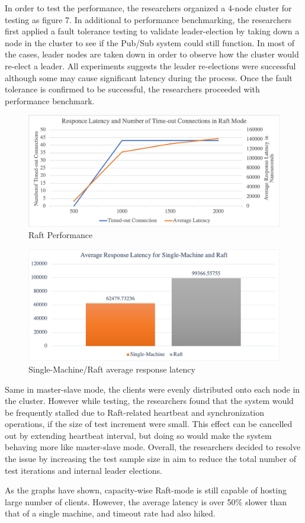 In order to test the performance, the researchers organized a 4-node cluster for testing as figure 7. In additional to performance benchmarking, the researchers first applied a fault tolerance testing to validate leader-election by taking down a node in the cluster to see if the Pub/Sub system could still function. In most of the cases, leader nodes are taken down in order to observe how the cluster would re-elect a leader. All experiments suggests the leader re-elections were successful although some may cause significant latency during the process. Once the fault tolerance is confirmed to be successful, the researchers proceeded with performance benchmark.

	
\begin{figure}[H]
	\centering
	\includegraphics[scale=0.33]{figure/raft/performance.png}
	\caption{Raft Performance}
\end{figure}
	
\begin{figure}[H]
	\centering
	\includegraphics[scale=0.33]{figure/raft/response-latency.png}
	\caption{Single-Machine/Raft average response latency}
\end{figure}

Same in master-slave mode, the clients were evenly distributed onto each node in the cluster. However while testing, the researchers found that the system would be frequently stalled due to Raft-related heartbeat and synchronization operations, if the size of test increment were small. This effect can be cancelled out by extending heartbeat interval, but doing so would make the system behaving more like master-slave mode. Overall, the researchers decided to resolve the issue by increasing the test sample size in aim to reduce the total number of test iterations and internal leader elections. 

As the graphs have shown, capacity-wise Raft-mode is still capable of hosting large number of clients. However, the average latency is over 50\% slower than that of a single machine, and timeout rate had also hiked.